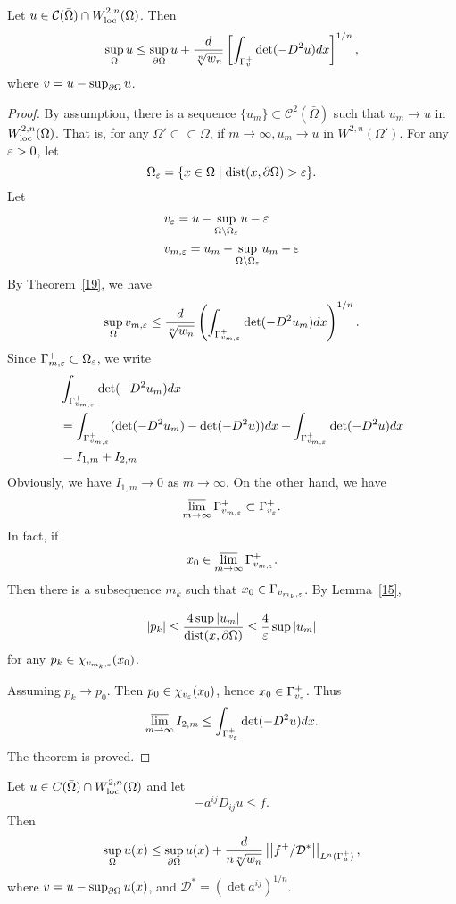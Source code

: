 \begin{theorem}\label{thm28} Let $u\in \mathcal C(\bar\Omega)\cap W_{{\rm loc}}^{2,n}(\Omega)$. Then
\[
\sup_\Omega u\leq\sup_{\partial\Omega} u+\frac{d}{\sqrt[n]{w_n}}\left[\int_{\Gamma_v^+}\det(-D^2 u) dx\right]^{1/n},
\]
where $v=u-\sup_{\partial\Omega} u$.
\end{theorem}

\begin{proof}  By assumption, there is a sequence $\{u_m\}\subset \mathcal C^2(\bar\Omega)$ such that $u_m\to u$ in $W_{{\rm loc}}^{2,n}(\Omega)$. That is, for any $\Omega'\subset\subset\Omega$, if $m\to\infty, u_m\to u$ in $W^{2,n}(\Omega')$. For any $\varepsilon>0$, let
\[
\Omega_\varepsilon=\{x\in\Omega\mid {\rm dist}(x,\partial\Omega)>\varepsilon\}.
\]
Let
\begin{align*}
&v_\varepsilon=u-\sup_{\Omega\backslash\Omega_\varepsilon} u-\varepsilon
\\
& v_{m,\varepsilon}=u_m-\sup_{\Omega\backslash\Omega_\varepsilon} u_m-\varepsilon
\end{align*}
By Theorem~\ref{19}, we have
\[
\sup_\Omega v_{m,\varepsilon}\leq\frac{d}{\sqrt[n]{w_n}}\left(\int_{\Gamma_{v_{m,\varepsilon}}^+}\det(-D^2 u_m) dx\right)^{1/n}.
\]
Since  $\Gamma^+_{m,\varepsilon}\subset\Omega_\varepsilon$, we write
\begin{align*}
&
\int_{\Gamma_{v_{m,\varepsilon}}^+}\det(-D^2 u_m) dx\\
&
=\int_{\Gamma_{v_{m,\varepsilon}}^+}(\det(-D^2 u_m) -\det(-D^2 u))dx+\int_{\Gamma_{v_{m,\varepsilon}}^+}\det(-D^2 u) dx\\
&=I_{1,m}+I_{2,m}
\end{align*}
Obviously,
we have $I_{1,m}\to 0$ as $m\to\infty$. On the other hand, we have
\[
\varlimsup_{m\to\infty}\Gamma_{v_{m,\varepsilon}}^+\subset\Gamma_{v_\varepsilon}^+.
\]
In fact, if 
\[
x_0\in\varlimsup_{m\to\infty}\Gamma_{v_{m,\varepsilon}}^+.
\]
Then there is a subsequence $m_k$ such that $x_0\in\Gamma_{v_{m_k,\varepsilon}}$. By Lemma~\ref{15},

\[
|p_k|\leq\frac{4\sup |u_m|}{{\rm dist}(x,\partial\Omega)}\leq\frac{4}{\varepsilon}\sup |u_m|
\]
for any $p_k\in\chi_{v_{m_k,\varepsilon}}(x_0)$.

Assuming $p_k\to p_0$. Then $p_0\in\chi_{v_\varepsilon}(x_0)$, hence $x_0\in\Gamma^+_{v_\varepsilon}$. Thus
\[
\varlimsup_{m\to\infty} I_{2,m}\leq\int_{\Gamma^+_{v_\varepsilon}}\det(-D^2 u) dx.
\]
The theorem is proved.

\end{proof}

\begin{theorem}\label{thm35}
Let $u\in \mathcal \mathcal C(\bar\Omega)\cap W_{{\rm loc}}^{2,n}(\Omega)$ and let 
\[
-a^{ij}D_{ij} u\leq f.
\]
Then
\[
\sup_\Omega u(x)\leq\sup_{\partial\Omega} u(x)+\frac{d}{n\sqrt[n]{w_n}}\left|\left|f^+/\mathcal D^*\right|\right|_{L^n(\Gamma_u^+)},
\]
where $v=u-\sup_{\partial\Omega} u(x)$, and $\mathcal D^*=(\det a^{ij})^{1/n}$.
\end{theorem}


